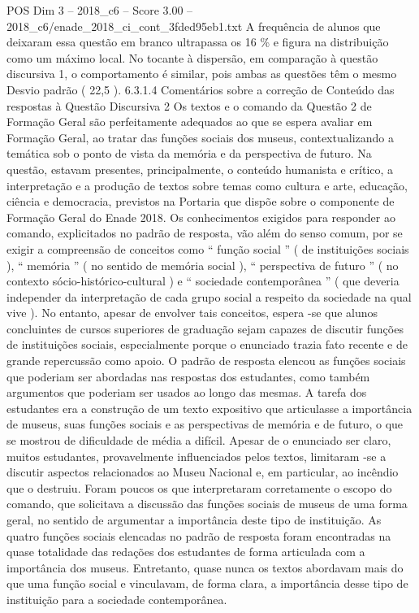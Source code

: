 \begin{textsample}{POS Dim 3 – 2018\_c6 – Score 3.00 – 2018\_c6/enade\_2018\_ci\_cont\_3fded95eb1.txt}
A frequência de alunos que deixaram essa questão em branco ultrapassa os 16 \% e figura na distribuição como um máximo local.
No tocante à dispersão, em comparação à questão discursiva 1, o comportamento é similar, pois ambas as questões têm o mesmo Desvio padrão ( 22,5 ). 6.3.1.4 Comentários sobre a correção de Conteúdo das respostas à Questão Discursiva 2 Os textos e o comando da Questão 2 de Formação Geral são perfeitamente adequados ao que se espera avaliar em Formação Geral, ao tratar das funções sociais dos museus, contextualizando a temática sob o ponto de vista da memória e da perspectiva de futuro.
Na questão, estavam presentes, principalmente, o conteúdo humanista e crítico, a interpretação e a produção de textos sobre temas como cultura e arte, educação, ciência e democracia, previstos na Portaria que dispõe sobre o componente de Formação Geral do Enade 2018.
Os conhecimentos exigidos para responder ao comando, explicitados no padrão de resposta, vão além do senso comum, por se exigir a compreensão de conceitos como “ função social ” ( de instituições sociais ), “ memória ” ( no sentido de memória social ), “ perspectiva de futuro ” ( no contexto sócio-histórico-cultural ) e “ sociedade contemporânea ” ( que deveria independer da interpretação de cada grupo social a respeito da sociedade na qual vive ).
No entanto, apesar de envolver tais conceitos, espera -se que alunos concluintes de cursos superiores de graduação sejam capazes de discutir funções de instituições sociais, especialmente porque o enunciado trazia fato recente e de grande repercussão como apoio.
O padrão de resposta elencou as funções sociais que poderiam ser abordadas nas respostas dos estudantes, como também argumentos que poderiam ser usados ao longo das mesmas.
A tarefa dos estudantes era a construção de um texto expositivo que articulasse a importância de museus, suas funções sociais e as perspectivas de memória e de futuro, o que se mostrou de dificuldade de média a difícil.
Apesar de o enunciado ser claro, muitos estudantes, provavelmente influenciados pelos textos, limitaram -se a discutir aspectos relacionados ao Museu Nacional e, em particular, ao incêndio que o destruiu.
Foram poucos os que interpretaram corretamente o escopo do comando, que solicitava a discussão das funções sociais de museus de uma forma geral, no sentido de argumentar a importância deste tipo de instituição.
As quatro funções sociais elencadas no padrão de resposta foram encontradas na quase totalidade das redações dos estudantes de forma articulada com a importância dos museus.
Entretanto, quase nunca os textos abordavam mais do que uma função social e vinculavam, de forma clara, a importância desse tipo de instituição para a sociedade contemporânea.

\end{textsample}
